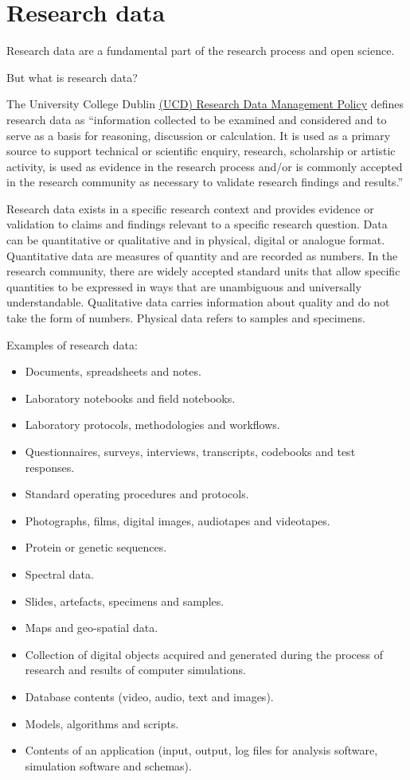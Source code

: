 \documentclass[
]{book}
\providecommand{\tightlist}{%
  \setlength{\itemsep}{0pt}\setlength{\parskip}{0pt}}
\begin{document}
\hypertarget{research-data}{%
\chapter{Research data}\label{research-data}}

Research data are a fundamental part of the research process and open science.

But what is research data?

The University College Dublin \href{https://hub.ucd.ie/usis/!W_HU_MENU.P_PUBLISH?p_tag=GD-DOCLAND\&ID=227}{(UCD) Research Data Management Policy} defines research data as ``information collected to be examined and considered and to serve as a basis for reasoning, discussion or calculation. It is used as a primary source to support technical or scientific enquiry, research, scholarship or artistic activity, is used as evidence in the research process and/or is commonly accepted in the research community as necessary to validate research findings and results.''

Research data exists in a specific research context and provides evidence or validation to claims and findings relevant to a specific research question. Data can be quantitative or qualitative and in physical, digital or analogue format. Quantitative data are measures of quantity and are recorded as numbers. In the research community, there are widely accepted standard units that allow specific quantities to be expressed in ways that are unambiguous and universally understandable. Qualitative data carries information about quality and do not take the form of numbers. Physical data refers to samples and specimens.

Examples of research data:

\begin{itemize}
\tightlist
\item
  Documents, spreadsheets and notes.
\item
  Laboratory notebooks and field notebooks.
\item
  Laboratory protocols, methodologies and workflows.
\item
  Questionnaires, surveys, interviews, transcripts, codebooks and test responses.
\item
  Standard operating procedures and protocols.
\item
  Photographs, films, digital images, audiotapes and videotapes.
\item
  Protein or genetic sequences.
\item
  Spectral data.
\item
  Slides, artefacts, specimens and samples.
\item
  Maps and geo-spatial data.
\item
  Collection of digital objects acquired and generated during the process of research and results of computer simulations.
\item
  Database contents (video, audio, text and images).
\item
  Models, algorithms and scripts.
\item
  Contents of an application (input, output, log files for analysis software, simulation software and schemas).
\end{itemize}
\end{document}
